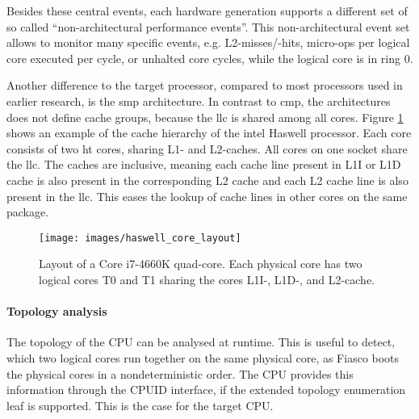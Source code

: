 Besides these central events, each hardware generation supports a different set
of so called ``non-architectural performance events''.
This non-architectural event set allows to monitor many specific events, e.g.
L2-misses/-hits, micro-ops per logical core executed per cycle, or unhalted
core cycles, while the logical core is in ring 0.

Another difference to the target processor, compared to most processors used in
earlier research, is the \gls{smp} architecture.
In contrast to \gls{cmp}, the architectures does not define cache groups,
because the \gls{llc} is shared among all cores.
Figure \ref{state:fig:core_layout} shows an example of the cache hierarchy of
the \gls{intel} Haswell processor.
Each core consists of two \gls{ht} cores, sharing L1- and L2-caches.
All cores on one socket share the \gls{llc}.
The caches are inclusive, meaning each cache line present in L1I or L1D
cache is also present in the corresponding L2 cache and each L2 cache line is
also present in the \gls{llc}.
This eases the lookup of cache lines in other cores on the same package.


\begin{figure}[h!]
  \centering
  \texttt{[image: images/haswell\_core\_layout]}
  \caption{Layout of a Core i7-4660K quad-core.
    Each physical core has two logical cores T0 and T1 sharing the cores L1I-,
    L1D-, and L2-cache.}
  \label{state:fig:core_layout}
\end{figure}

\paragraph{Topology analysis}
The topology of the CPU can be analysed at runtime.
This is useful to detect, which two logical cores run together on the same
physical core, as Fiasco boots the physical cores in a nondeterministic order.
The CPU provides this information through the CPUID interface, if the
extended topology enumeration leaf is supported. This is the case for the
target CPU.

